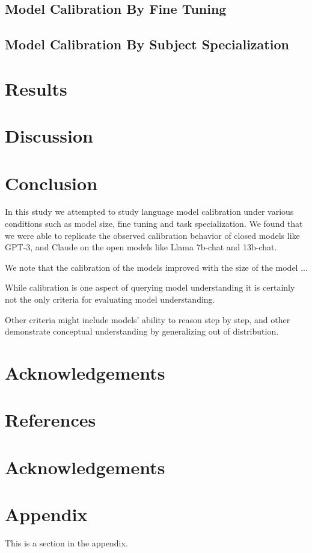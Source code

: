 \documentclass[11pt]{article}
\begin{document}
\subsection{Model Calibration By Fine Tuning}  


\subsection{Model Calibration By Subject Specialization}  

\section{Results}

\section{Discussion}

\section{Conclusion}

In this study we attempted to study language model calibration 
under various conditions such as model size, fine tuning and  
task specialization. We found that we were able to replicate the 
observed  calibration behavior of closed models like GPT-3, and 
Claude on the open models like Llama 7b-chat and 13b-chat. 

We note that the calibration of the models  improved with the size 
of the model ...

While calibration is one aspect of querying model understanding it is 
certainly  not the only criteria for evaluating model understanding.  

Other criteria might include models' ability to reason step by step, 
and other demonstrate conceptual understanding by generalizing 
out of distribution. 

\section{Acknowledgements}

\section{References}

\section{Acknowledgements}




\appendix

\section{Appendix}
\label{sec:appendix}

This is a section in the appendix.
\end{document}
